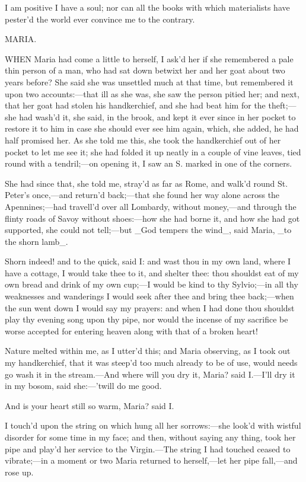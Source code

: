 \documentclass[twoside]{article}
\begin{document}
I am positive I have a soul; nor can all the books with which
materialists have pester’d the world ever convince me to the contrary.




MARIA.


WHEN Maria had come a little to herself, I ask’d her if she remembered a
pale thin person of a man, who had sat down betwixt her and her goat
about two years before?  She said she was unsettled much at that time,
but remembered it upon two accounts:—that ill as she was, she saw the
person pitied her; and next, that her goat had stolen his handkerchief,
and she had beat him for the theft;—she had wash’d it, she said, in the
brook, and kept it ever since in her pocket to restore it to him in case
she should ever see him again, which, she added, he had half promised
her.  As she told me this, she took the handkerchief out of her pocket to
let me see it; she had folded it up neatly in a couple of vine leaves,
tied round with a tendril;—on opening it, I saw an S. marked in one of
the corners.

She had since that, she told me, stray’d as far as Rome, and walk’d round
St. Peter’s once,—and return’d back;—that she found her way alone across
the Apennines;—had travell’d over all Lombardy, without money,—and
through the flinty roads of Savoy without shoes:—how she had borne it,
and how she had got supported, she could not tell;—but _God tempers the
wind_, said Maria, _to the shorn lamb_.

Shorn indeed! and to the quick, said I: and wast thou in my own land,
where I have a cottage, I would take thee to it, and shelter thee: thou
shouldst eat of my own bread and drink of my own cup;—I would be kind to
thy Sylvio;—in all thy weaknesses and wanderings I would seek after thee
and bring thee back;—when the sun went down I would say my prayers: and
when I had done thou shouldst play thy evening song upon thy pipe, nor
would the incense of my sacrifice be worse accepted for entering heaven
along with that of a broken heart!

Nature melted within me, as I utter’d this; and Maria observing, as I
took out my handkerchief, that it was steep’d too much already to be of
use, would needs go wash it in the stream.—And where will you dry it,
Maria? said I.—I’ll dry it in my bosom, said she:—’twill do me good.

And is your heart still so warm, Maria? said I.

I touch’d upon the string on which hung all her sorrows:—she look’d with
wistful disorder for some time in my face; and then, without saying any
thing, took her pipe and play’d her service to the Virgin.—The string I
had touched ceased to vibrate;—in a moment or two Maria returned to
herself,—let her pipe fall,—and rose up.
\end{document}
